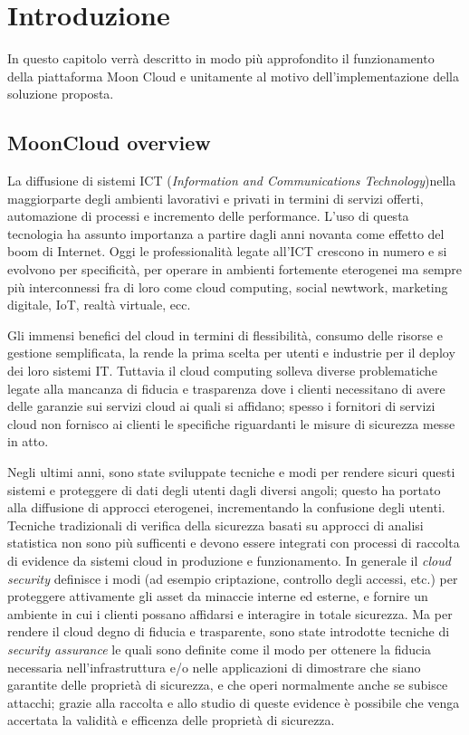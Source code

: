 \chapter{Introduzione}
In questo capitolo verrà descritto in modo più approfondito 
il funzionamento della piattaforma Moon Cloud e unitamente al 
motivo dell'implementazione della soluzione proposta.

\section{MoonCloud overview}
La diffusione di sistemi ICT (\textit{Information and Communications Technology})nella maggiorparte degli ambienti lavorativi 
e privati in termini di servizi offerti, automazione di processi e incremento delle performance. L'uso di questa tecnologia 
ha assunto importanza a partire dagli anni novanta come effetto del boom di Internet.
Oggi le professionalità legate all'ICT crescono in numero e si evolvono per specificità, per operare in ambienti fortemente 
eterogenei ma sempre più interconnessi fra di loro come cloud computing, social newtwork, marketing digitale, IoT, 
realtà virtuale, ecc.

Gli immensi benefici del cloud in termini di flessibilità, consumo delle risorse e gestione semplificata, la rende la prima 
scelta per utenti e industrie per il deploy dei loro sistemi IT. Tuttavia il cloud computing solleva diverse problematiche
legate alla mancanza di fiducia e trasparenza dove i clienti necessitano di avere delle garanzie sui servizi cloud ai quali 
si affidano; spesso i fornitori di servizi cloud non fornisco ai clienti le specifiche riguardanti le misure di sicurezza 
messe in atto.

Negli ultimi anni, sono state sviluppate tecniche e modi per rendere sicuri questi sistemi e proteggere di dati degli utenti 
dagli diversi angoli; questo ha portato alla diffusione di approcci eterogenei, incrementando la confusione degli utenti.
Tecniche tradizionali di verifica della sicurezza basati su approcci di analisi statistica non sono più sufficenti e
devono essere integrati con processi di raccolta di evidence da sistemi cloud in produzione e funzionamento. 
In generale il \textit{cloud security} definisce i modi (ad esempio criptazione, controllo degli accessi, etc.) per 
proteggere attivamente gli asset da minaccie interne ed esterne, e fornire un ambiente in cui i clienti possano affidarsi 
e interagire in totale sicurezza. 
Ma per rendere il cloud degno di fiducia e trasparente, sono state introdotte tecniche di \textit{security assurance} le 
quali sono definite come il modo per ottenere la fiducia necessaria nell'infrastruttura e/o nelle applicazioni di 
dimostrare che siano garantite delle proprietà di sicurezza, e che operi normalmente anche se subisce attacchi; grazie alla 
raccolta e allo studio di queste evidence è possibile che venga accertata la validità e efficenza delle proprietà di 
sicurezza.

